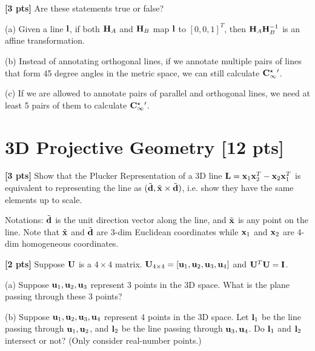 \documentclass[11pt,addpoints,answers]{exam}
\numberwithin{equation}{section} %
\numberwithin{figure}{section} %
\numberwithin{table}{section} %
\begin{document}
\begin{questions}
\question \textbf{[3 pts]} Are these statements true or false?


(a) Given a line $\mathbf{l}$, if both $\mathbf{H}_A$ and $\mathbf{H}_B$ map $\mathbf{l}$ to $[0,0,1]^T$, then $\mathbf{H}_A\mathbf{H}_B^{-1}$ is an affine transformation. 

(b) Instead of annotating orthogonal lines, if we annotate multiple pairs of lines that form 45 degree angles in the metric space, we can still calculate $\mathbf{C}_\infty^{\star}{}'$.

(c) If we are allowed to annotate pairs of parallel and orthogonal lines, we need at least 5 pairs of them to calculate $\mathbf{C}_\infty^{\star}{}'$.

\begin{tcolorbox}[fit,height=5cm, width=\textwidth, blank, borderline={0.5pt}{-2pt},halign=left, valign=center, nobeforeafter]



\end{tcolorbox}


\section{3D Projective Geometry [12 pts]}

\question \textbf{[3 pts]} Show that the Plucker Representation of a 3D line $\mathbf{L} = \mathbf{x}_1\mathbf{x}_2^T - \mathbf{x}_2\mathbf{x}_1^T$ is equivalent to representing the line as $(\tilde {\mathbf{d}}, \tilde {\mathbf{x}} \times \tilde {\mathbf{d}})$, i.e. show they have the same elements up to scale.

Notations: $\tilde{\mathbf{d}}$ is the unit direction vector along the line, and $\tilde {\mathbf{x}}$ is any point on the line. Note that $\tilde{\mathbf{x}}$ and $\tilde{\mathbf{d}}$ are 3-dim Euclidean coordinates while $\mathbf{x}_1$ and $\mathbf{x}_2$ are 4-dim homogeneous coordinates.

\begin{tcolorbox}[fit,height=10cm, width=\textwidth, blank, borderline={0.5pt}{-2pt},halign=left, valign=center, nobeforeafter]


\end{tcolorbox}

\question \textbf{[2 pts]} Suppose $\mathbf{U}$ is a $4\times 4$ matrix. $\mathbf{U}_{4 \times 4} = [\mathbf{u}_1, \mathbf{u}_2, \mathbf{u}_3, \mathbf{u}_4]$ and $\mathbf{U}^T\mathbf{U} = \mathbf{I}$.

(a) Suppose $\mathbf{u}_1, \mathbf{u}_2, \mathbf{u}_3$ represent 3 points in the 3D space. What is the plane passing through these 3 points?

(b) Suppose $\mathbf{u}_1, \mathbf{u}_2, \mathbf{u}_3, \mathbf{u}_4$ represent 4 points in the 3D space. Let $\mathbf{l}_1$ be the line passing through $\mathbf{u}_1, \mathbf{u}_2$, and $\mathbf{l}_2$ be the line passing through $\mathbf{u}_3, \mathbf{u}_4$. Do $\mathbf{l}_1$ and $\mathbf{l}_2$ intersect or not? (Only consider real-number points.)


\end{questions}
\end{document}
